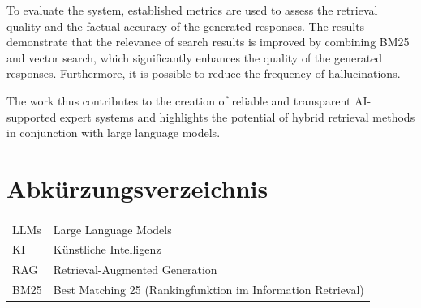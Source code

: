 To evaluate the system, established metrics are used to assess the retrieval quality and the factual accuracy of the generated responses. The results demonstrate that the relevance of search results is improved by combining BM25 and vector search, which significantly enhances the quality of the generated responses.  Furthermore, it is possible to reduce the frequency of hallucinations.

The work thus contributes to the creation of reliable and transparent AI-supported expert systems and highlights the potential of hybrid retrieval methods in conjunction with large language models.

\clearpage




\tableofcontents %
\newpage


\listoffigures %
\clearpage




\listoftables %
\clearpage


\section*{Abkürzungsverzeichnis} %


\begin{tabular}{@{\bf}ll}
	LLMs			  & Large Language Models\\
	KI   		  & Künstliche Intelligenz \\ 
	RAG			  & Retrieval-Augmented Generation\\
	  BM25		  &  Best Matching 25 (Rankingfunktion im Information Retrieval)\\
      



   
  
  
	 	
\end{tabular}

\newpage


% 

\lhead{\leftmark}
